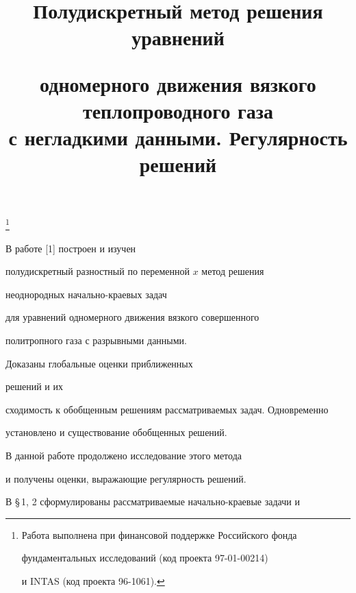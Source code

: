 

\title{Полудискретный метод решения уравнений


одномерного движения вязкого теплопроводного газа\\


с негладкими данными. Регулярность решений}


\thanks{Работа выполнена при финансовой поддержке Российского фонда


фундаментальных исследований (код проекта 97-01-00214)


и INTAS (код проекта 96-1061).}





\date{}




\pagestyle{plain} %







\maketitle


\label{begin}





В работе [1] построен и изучен


полудискретный разностный по переменной $x$ метод решения


неоднородных начально-краевых задач


для уравнений одномерного движения вязкого совершенного


политропного газа с разрывными данными.


Доказаны глобальные оценки приближенных


решений и их


сходимость к обобщенным решениям рассматриваемых задач. Одновременно


установлено и существование обобщенных решений.





В данной работе продолжено исследование этого метода


и получены оценки, выражающие регулярность решений.


В \S\,1, 2 сформулированы рассматриваемые начально-краевые задачи и



